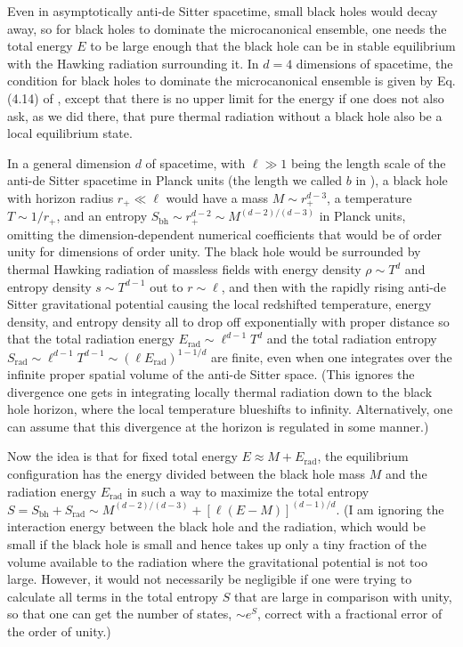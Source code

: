 \documentclass[12pt]{article} \usepackage{latexsym} \textwidth 15cm
\begin{document}
Even in asymptotically anti-de Sitter spacetime, small black holes would
decay away, so for black holes to dominate the microcanonical ensemble,
one needs the total energy $E$ to be large enough that the black hole
can be in stable equilibrium with the Hawking radiation surrounding
it.  In $d=4$ dimensions of spacetime, the condition for black holes to
dominate the microcanonical ensemble is given by Eq. (4.14) of
\cite{HawPage}, except that there is no upper limit for the energy if
one does not also ask, as we did there, that pure thermal radiation
without a black hole also be a local equilibrium state.

In a general dimension $d$ of spacetime, with $\ell \gg 1$ being the
length scale of the anti-de Sitter spacetime in Planck units (the length
we called $b$ in \cite{HawPage}), a black hole with horizon radius $r_+
\ll \ell$ would have a mass $M \sim r_+^{d-3}$, a temperature $T \sim
1/r_+$, and an entropy $S_{\mathrm{bh}} \sim r_+^{d-2} \sim
M^{(d-2)/(d-3)}$ in Planck units, omitting the dimension-dependent
numerical coefficients that would be of order unity for dimensions of
order unity.  The black hole would be surrounded by thermal Hawking
radiation of massless fields with energy density $\rho \sim T^d$ and
entropy density $s \sim T^{d-1}$ out to $r \sim \ell$, and then with
the rapidly rising anti-de Sitter gravitational potential causing the
local redshifted temperature, energy density, and entropy density all
to drop off exponentially with proper distance so that the total
radiation energy $E_{\mathrm{rad}} \sim \ell^{d-1} T^d$ and the total
radiation entropy $S_{\mathrm{rad}} \sim \ell^{d-1} T^{d-1} \sim (\ell
E_{\mathrm{rad}})^{1-1/d}$ are finite, even when one integrates over
the infinite proper spatial volume of the anti-de Sitter space.  (This
ignores the divergence one gets in integrating locally thermal
radiation down to the black hole horizon, where the local temperature
blueshifts to infinity.  Alternatively, one can assume that this
divergence at the horizon is regulated in some manner.)

Now the idea \cite{Haw3,PagGRG,HawPage} is that for fixed total energy
$E \approx M + E_{\mathrm{rad}}$, the equilibrium configuration has the
energy divided between the black hole mass $M$ and the radiation energy
$E_{\mathrm{rad}}$ in such a way to maximize the total entropy $S =
S_{\mathrm{bh}} + S_{\mathrm{rad}} \sim M^{(d-2)/(d-3)} +
[\ell(E-M)]^{(d-1)/d}$.  (I am ignoring the interaction energy between
the black hole and the radiation, which would be small if the black
hole is small and hence takes up only a tiny fraction of the volume
available to the radiation where the gravitational potential is not too
large.  However, it would not necessarily be negligible if one were
trying to calculate all terms in the total entropy $S$ that are large
in comparison with unity, so that one can get the number of states,
$\sim e^S$, correct with a fractional error of the order of unity.) 
\end{document}
